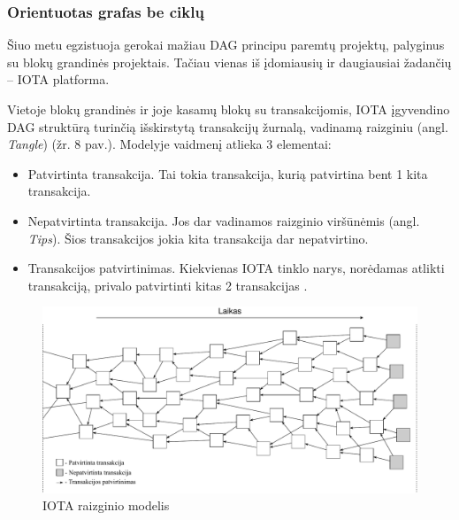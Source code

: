 \subsubsection{Orientuotas grafas be ciklų}

Šiuo metu egzistuoja gerokai mažiau DAG principu paremtų projektų, palyginus su blokų grandinės projektais. Tačiau vienas iš įdomiausių ir daugiausiai žadančių – IOTA platforma. 





Vietoje blokų grandinės ir joje kasamų blokų su transakcijomis, IOTA įgyvendino DAG struktūrą turinčią išskirstytą transakcijų žurnalą, vadinamą raizginiu (angl. \textit{Tangle}) (žr. 8 pav.). Modelyje vaidmenį atlieka 3 elementai:
\begin{itemize}
    \item Patvirtinta transakcija. Tai tokia transakcija, kurią patvirtina bent 1 kita transakcija.
    \item Nepatvirtinta transakcija. Jos dar vadinamos raizginio viršūnėmis (angl. \textit{Tips}). Šios transakcijos jokia kita transakcija dar nepatvirtino.
    \item Transakcijos patvirtinimas. Kiekvienas IOTA tinklo narys, norėdamas atlikti transakciją, privalo patvirtinti kitas 2 transakcijas \cite{popov2016tangle}.
\end{itemize} 

\begin{figure}[H]
    \centering
    \includegraphics[scale=0.56]{images/iota-tangle}
    \caption{IOTA raizginio modelis \cite{popov2016tangle}}
\end{figure}

